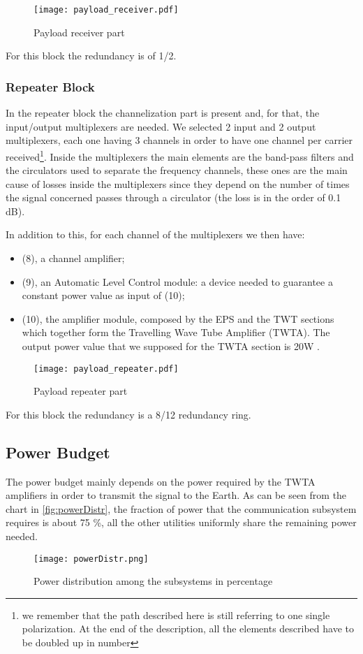 \begin{figure}[h]
	\centering
	\texttt{[image: payload\_receiver.pdf]}
	\caption{Payload receiver part}
	\label{fig:receiver}
\end{figure}
For this block the redundancy is of 1/2.

\subsubsection{Repeater Block}
	In the repeater block the channelization part is present and, for that, the input/output multiplexers are needed. We selected 2 input and 2 output multiplexers, each one having 3 channels in order to have one channel per carrier received\footnote{we remember that the path described here is still referring to one single polarization. At the end of the description, all the elements described have to be doubled up in number}. Inside the multiplexers the main elements are the band-pass filters and the circulators used to separate the frequency channels, these ones are the main cause of losses inside the multiplexers since they depend on the number of times the signal concerned passes through a circulator (the loss is in the order of 0.1 dB).

In addition to this, for each channel of the multiplexers we then have:
	\begin{itemize}
	\item (8), a channel amplifier;
	\item (9), an Automatic Level Control module: a device needed to guarantee a constant power value as input of 					(10);
	\item (10), the amplifier module, composed by the EPS and the TWT sections which together form the Travelling Wave Tube Amplifier (TWTA). The output power value that we supposed for the TWTA section is 20W \cite{Maral2017}.
	\end{itemize}
	\begin{figure}[h]
		\centering
		\texttt{[image: payload\_repeater.pdf]}
		\caption{Payload repeater part}
		\label{fig:repeater}
	\end{figure}
For this block the redundancy is a 8/12 redundancy ring.

\subsection{Power Budget}
The power budget mainly depends on the power required by the TWTA amplifiers in order to transmit the signal to the Earth. As can be seen from the chart in \autoref{fig:powerDistr}, the fraction of power that the communication subsystem requires is about 75 \%, all the other utilities uniformly share the remaining power needed.
\begin{figure}[h]
\centering
\texttt{[image: powerDistr.png]}
\caption{Power distribution among the subsystems in percentage}
\label{fig:powerDistr}
\end{figure}
